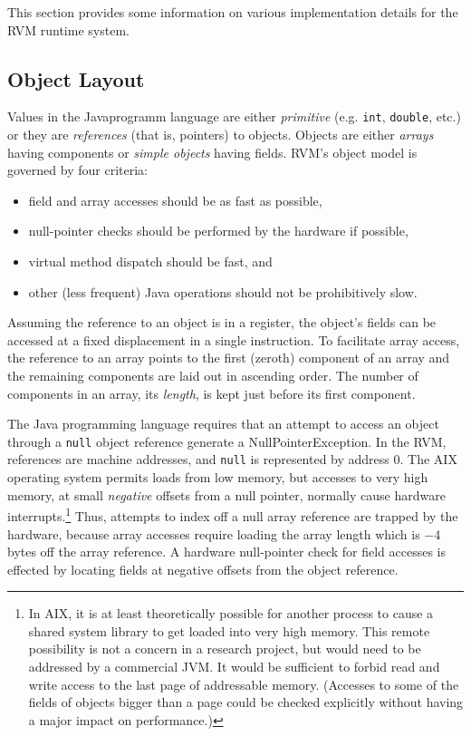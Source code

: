 This section provides some information on various
implementation details for the RVM runtime system.

\subsection{Object Layout} \label{sssec:objects}
Values in the Java\trademark programm language are either {\em
primitive} (e.g. {\tt int}, 
{\tt double}, etc.)  or they are {\em references} (that is, pointers) to
objects.  Objects are either {\em arrays} having components or {\em
simple objects} having fields.  RVM's object model is governed by four
criteria: 
\begin{itemize}
\item{}
field and array accesses should be as fast as possible,
\item{}
null-pointer checks should be performed by the hardware if possible, 
\item{}
virtual method dispatch should be fast, and 
\item{}
other (less frequent) Java operations  should not be prohibitively slow.
\end{itemize}

Assuming the reference to an object is in a register, the object's
fields can be accessed at a fixed displacement in a single
instruction.  To facilitate array access, the reference to an array
points to the first (zeroth) component of an array and the remaining
components are laid out in ascending order.  The number of components
in an array, its {\em length}, is kept just before its first
component.

The Java programming language requires that an attempt to access an
object through a {\tt null} 
object reference generate a NullPointerException.  In the RVM, references
are machine addresses, and {\tt null} is represented by address $0$.
The AIX operating system permits loads from low memory, but accesses
to very high memory, at small {\em negative} offsets from a null
pointer, normally cause hardware interrupts.\footnote{In AIX, it is at
least theoretically possible for another process to cause a shared
system library to get loaded into very high memory.  This remote
possibility is not a concern in a research project, but would need to
be addressed by a commercial JVM.  It would be sufficient to forbid
read and write access to the last page of addressable memory.
(Accesses to some of the fields of objects bigger than a page could be
checked explicitly without having a major impact on performance.)}
Thus, attempts to index off a null array reference are trapped by
the hardware, because array accesses require loading the array length
which is $-4$ bytes off the array reference.  A hardware null-pointer
check for field accesses is effected by locating fields at negative
offsets from the object reference.

